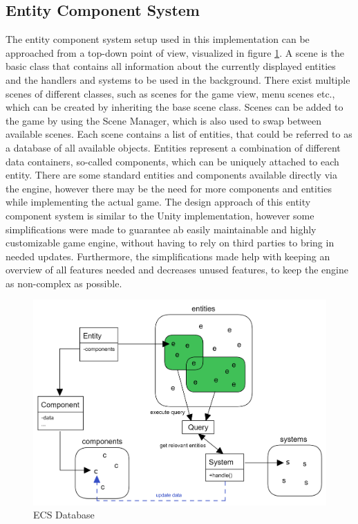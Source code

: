 \subsection{Entity Component System}\label{subsec:entity-component-system-implementation}
The entity component system setup used in this implementation can be approached from a top-down point of view, visualized in figure \ref{fig:ecs}.
A scene is the basic class that contains all information about the currently displayed entities and the handlers and systems to be used
in the background.
There exist multiple scenes of different classes, such as scenes for the game view, menu scenes etc., which can be created by
inheriting the base scene class.
Scenes can be added to the game by using the Scene Manager, which is also used to swap between available scenes.
Each scene contains a list of entities, that could be referred to as a database of all available objects.
Entities represent a combination of different data containers, so-called components, which can be uniquely attached to each entity.
There are some standard entities and components available directly via the engine, however there may be the need for more components and entities while implementing the actual game.
The design approach of this entity component system is similar to the Unity implementation, however some simplifications were made to guarantee ab easily maintainable
and highly customizable game engine, without having to rely on third parties to bring in needed updates.
Furthermore, the simplifications made help with keeping an overview of all features needed and decreases unused features, to keep the engine as non-complex as possible.
\begin{figure}
    \centering
    \includegraphics[width=\textwidth]{Pictures/res/implementation/ecs-database}
    \caption{\gls{ECS} Database}
    \label{fig:ecs}
\end{figure}
